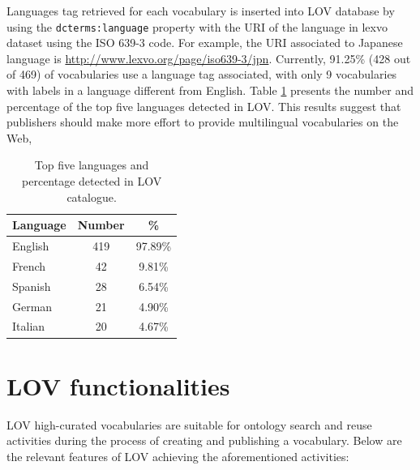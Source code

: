 \documentclass{iosart2c}
\newcommand{\py}[1]{\textcolor{olive}{\textbf{[PIERRE-YVES TO:#1]}}}
\begin{document}
Languages tag retrieved for each vocabulary is inserted into LOV database by using the \texttt{dcterms:language} property with the URI of the language in lexvo dataset using the ISO 639-3 code. For example, the URI associated to Japanese language is \url{http://www.lexvo.org/page/iso639-3/jpn}. Currently, 91.25\% (428 out of 469) of vocabularies use a language tag associated, with only 9 vocabularies with labels in a language different from English. Table \ref{tab:language} presents the number and percentage of the top five languages detected in LOV. This results suggest that publishers should make more effort to provide multilingual vocabularies on the Web,
 
 \begin{table}[h!tb]
\caption{Top five languages and percentage detected in LOV catalogue.}
\begin{tabular}{lcc}
\hline
\textbf{Language} & \textbf{Number} & \textbf{\%}  \\ \hline
English  & 419   &  97.89\%      \\
French & 42 & 9.81\% \\
Spanish & 28 & 6.54\%\\
German & 21 & 4.90\%\\
Italian & 20 & 4.67\%\\
\hline  
\end{tabular}
\label{tab:language}
\end{table}

\section{LOV functionalities}
\label{sec:about}


LOV high-curated vocabularies are suitable for ontology search and reuse activities during the process of creating and publishing a vocabulary. Below are the relevant features of LOV achieving the aforementioned activities:
\end{document}
